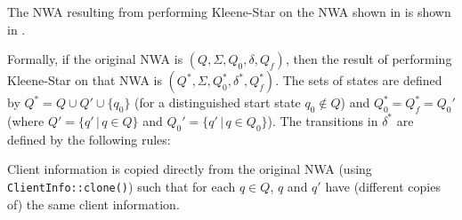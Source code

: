 The NWA resulting from performing Kleene-Star on the NWA shown in
 is shown in .

Formally, if the original NWA is $(Q, \Sigma, Q_0, \delta, Q_f)$,
then the result of performing Kleene-Star on that NWA is $(Q^*, \Sigma,
Q_0^*, \delta^*, Q_f^*)$. The sets of states are defined by $Q^* = Q \cup
Q' \cup \{q_0\}$ (for a distinguished start state $q_0 \not\in Q$)
and  $Q_0^* = Q_f^* = Q_0'$ (where $Q' = \{q'\, |\, q \in Q\}$ and $Q_0' =
\{q'\, |\, q \in Q_0\}$).
The transitions in $\delta^*$ are defined by the following rules:



Client information is copied directly from the original NWA (using
\texttt{ClientInfo::clone()}) such that for each $q \in Q$, $q$
and $q'$ have (different copies of) the same client information.



